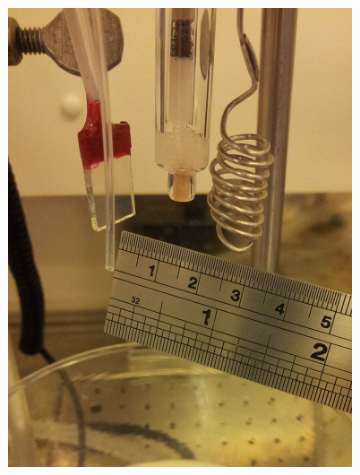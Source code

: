 \documentclass[draft,webedition,openright,titles,swedish,english]{LuaUUThesis}\usepackage[]{graphicx}\usepackage[]{xcolor}
\begin{document}
\begin{figure}[tbp]
\begin{subfigure}[b]{0.25\linewidth}
   \includegraphics[width=\textwidth]{synthesis/electrodeposition/autolab-cell-electrodes-distance_0508130452-cropped.jpg}
   \caption{}
   \label{fig:0301-ED-electrodes-distance}
\end{subfigure}%
\hspace{7pt}%
\begin{subfigure}[b]{0.25\linewidth}
   \centering

\end{subfigure}
\end{figure}
\end{document}
